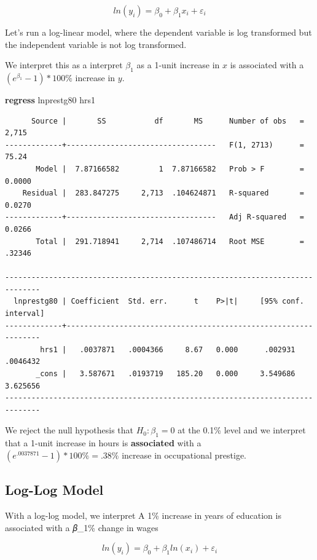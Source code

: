 \documentclass[
]{book}
\newenvironment{Shaded}{\begin{snugshade}}{\end{snugshade}}
\newcommand{\KeywordTok}[1]{\textcolor[rgb]{0.13,0.29,0.53}{\textbf{#1}}}
\newcommand{\NormalTok}[1]{#1}
\begin{document}
\[ ln(y_i) = \beta_0 + \beta_1 x_i + \varepsilon_i \]

Let's run a log-linear model, where the dependent variable is log transformed but the independent variable is not log transformed.

We interpret this as a interpret \(\beta_1\) as a 1-unit increase in \(x\) is associated with a \((e^{\beta_{1}}-1)*100 \%\) increase in \(y\).

\begin{Shaded}
\begin{Highlighting}[]
\KeywordTok{regress}\NormalTok{ lnprestg80 hrs1}
\end{Highlighting}
\end{Shaded}

\begin{verbatim}
      Source |       SS           df       MS      Number of obs   =     2,715
-------------+----------------------------------   F(1, 2713)      =     75.24
       Model |  7.87166582         1  7.87166582   Prob > F        =    0.0000
    Residual |  283.847275     2,713  .104624871   R-squared       =    0.0270
-------------+----------------------------------   Adj R-squared   =    0.0266
       Total |  291.718941     2,714  .107486714   Root MSE        =    .32346

------------------------------------------------------------------------------
  lnprestg80 | Coefficient  Std. err.      t    P>|t|     [95% conf. interval]
-------------+----------------------------------------------------------------
        hrs1 |   .0037871   .0004366     8.67   0.000      .002931    .0046432
       _cons |   3.587671   .0193719   185.20   0.000     3.549686    3.625656
------------------------------------------------------------------------------
\end{verbatim}

We reject the null hypothesis that \(H_0: \beta_1 = 0\) at the 0.1\% level and we interpret that a 1-unit increase in hours is \textbf{associated} with a \((e^{.0037871}-1)*100 \% = .38\%\) increase in occupational prestige.

\subsection{Log-Log Model}\label{log-log-model}

With a log-log model, we interpret A 1\% increase in years of education is associated with a 𝛽\_1\% change in wages

\[ ln(y_i) = \beta_0 + \beta_1 ln(x_i) + \varepsilon_i \]
\end{document}
